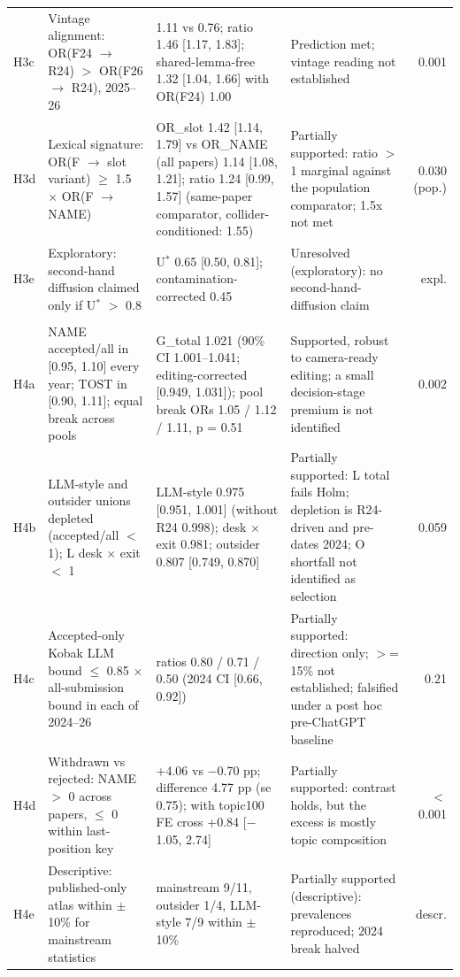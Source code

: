 \begin{table}[t]
\begin{tabular}{l p{3.4cm} p{5.0cm} p{3.6cm} r}
H3c & Vintage alignment: OR(F24 $\rightarrow$ R24) $>$ OR(F26 $\rightarrow$ R24), 2025--26 & 1.11 vs 0.76; ratio 1.46 [1.17, 1.83]; shared-lemma-free 1.32 [1.04, 1.66] with OR(F24) 1.00 & Prediction met; vintage reading not established & 0.001 \\
H3d & Lexical signature: OR(F $\rightarrow$ slot variant) $\geq$ 1.5 $\times$ OR(F $\rightarrow$ NAME) & OR\_slot 1.42 [1.14, 1.79] vs OR\_NAME (all papers) 1.14 [1.08, 1.21]; ratio 1.24 [0.99, 1.57] (same-paper comparator, collider-conditioned: 1.55) & Partially supported: ratio $>$ 1 marginal against the population comparator; 1.5x not met & 0.030 (pop.) \\
H3e & Exploratory: second-hand diffusion claimed only if U$^{*}$ $>$ 0.8 & U$^{*}$ 0.65 [0.50, 0.81]; contamination-corrected 0.45 & Unresolved (exploratory): no second-hand-diffusion claim & expl. \\
\addlinespace
\multicolumn{5}{l}{\textit{D4 The gatekeeper (2024--26 pooled)}} \\
H4a & NAME accepted/all in [0.95, 1.10] every year; TOST in [0.90, 1.11]; equal break across pools & G\_total 1.021 (90\% CI 1.001--1.041; editing-corrected [0.949, 1.031]); pool break ORs 1.05 / 1.12 / 1.11, p = 0.51 & Supported, robust to camera-ready editing; a small decision-stage premium is not identified & 0.002 \\
H4b & LLM-style and outsider unions depleted (accepted/all $<$ 1); L desk $\times$ exit $<$ 1 & LLM-style 0.975 [0.951, 1.001] (without R24 0.998); desk $\times$ exit 0.981; outsider 0.807 [0.749, 0.870] & Partially supported: L total fails Holm; depletion is R24-driven and pre-dates 2024; O shortfall not identified as selection & 0.059 \\
H4c & Accepted-only Kobak LLM bound $\leq$ 0.85 $\times$ all-submission bound in each of 2024--26 & ratios 0.80 / 0.71 / 0.50 (2024 CI [0.66, 0.92]) & Partially supported: direction only; $>$= 15\% not established; falsified under a post hoc pre-ChatGPT baseline & 0.21 \\
H4d & Withdrawn vs rejected: NAME $>$ 0 across papers, $\leq$ 0 within last-position key & +4.06 vs $-$0.70 pp; difference 4.77 pp (se 0.75); with topic100 FE cross +0.84 [$-$1.05, 2.74] & Partially supported: contrast holds, but the excess is mostly topic composition & $<$0.001 \\
H4e & Descriptive: published-only atlas within $\pm$10\% for mainstream statistics & mainstream 9/11, outsider 1/4, LLM-style 7/9 within $\pm$10\% & Partially supported (descriptive): prevalences reproduced; 2024 break halved & descr. \\

\end{tabular}
\end{table}

